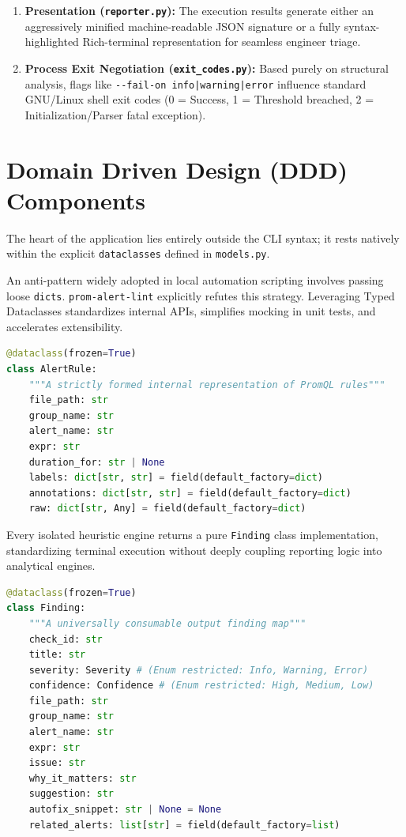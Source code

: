 \documentclass[a4paper,11pt]{article}
\begin{document}
\begin{enumerate}
    \item \textbf{Presentation (\texttt{reporter.py}):} The execution results generate either an aggressively minified machine-readable JSON signature or a fully syntax-highlighted Rich-terminal representation for seamless engineer triage.
    
    \item \textbf{Process Exit Negotiation (\texttt{exit\_codes.py}):} Based purely on structural analysis, flags like \texttt{-{}-fail-on info|warning|error} influence standard GNU/Linux shell exit codes (0 = Success, 1 = Threshold breached, 2 = Initialization/Parser fatal exception).
\end{enumerate}

\section{Domain Driven Design (DDD) Components}

The heart of the application lies entirely outside the CLI syntax; it rests natively within the explicit \texttt{dataclasses} defined in \texttt{models.py}.

An anti-pattern widely adopted in local automation scripting involves passing loose \texttt{dicts}. \texttt{prom-alert-lint} explicitly refutes this strategy. Leveraging Typed Dataclasses standardizes internal APIs, simplifies mocking in unit tests, and accelerates extensibility.

\begin{lstlisting}[language=python, caption={The Internal AlertRule Immutable Contract}]
@dataclass(frozen=True)
class AlertRule:
    """A strictly formed internal representation of PromQL rules"""
    file_path: str
    group_name: str
    alert_name: str
    expr: str
    duration_for: str | None
    labels: dict[str, str] = field(default_factory=dict)
    annotations: dict[str, str] = field(default_factory=dict)
    raw: dict[str, Any] = field(default_factory=dict)
\end{lstlisting}

Every isolated heuristic engine returns a pure \texttt{Finding} class implementation, standardizing terminal execution without deeply coupling reporting logic into analytical engines.

\begin{lstlisting}[language=python, caption={The Standardized Finding Output Guarantee}]
@dataclass(frozen=True)
class Finding:
    """A universally consumable output finding map"""
    check_id: str
    title: str
    severity: Severity # (Enum restricted: Info, Warning, Error)
    confidence: Confidence # (Enum restricted: High, Medium, Low)
    file_path: str
    group_name: str
    alert_name: str
    expr: str
    issue: str
    why_it_matters: str
    suggestion: str
    autofix_snippet: str | None = None
    related_alerts: list[str] = field(default_factory=list)
\end{lstlisting}
\end{document}
